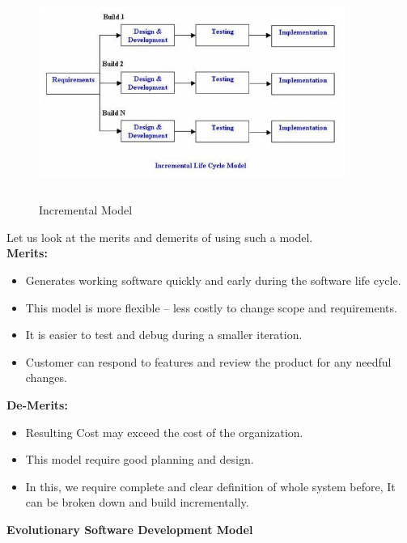 \documentclass{article}
\begin{document}
\begin{figure}
  \includegraphics[width=10cm, height=7cm]{fig6.jpg}
  \caption{Incremental Model }
  
\end{figure}
Let us look at the merits and demerits of using such a model.\\
\textbf{Merits:}
\begin{itemize}
\item 	Generates working  software quickly and early during the software life cycle.
\item 	This model is more flexible – less costly to change scope and requirements.
\item	It is easier to test and debug during a smaller iteration.
\item	Customer can respond to features and review the product for any needful changes.
\end{itemize}
\vspace{4cm}
\textbf{De-Merits:}
\begin{itemize}
\item	Resulting Cost may exceed the cost of the organization.
\item	This model require good planning and design.
\item	In this, we require complete and clear definition of whole system before, It can be broken down and build incrementally.
\end{itemize}

\vspace{0.5cm}
\large{\textbf{Evolutionary Software Development Model}}
\end{document}
